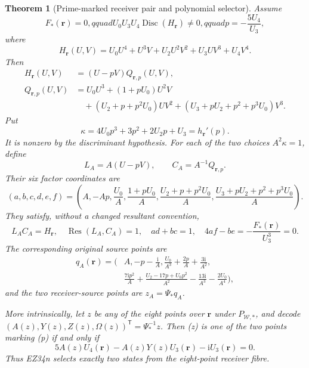 \documentclass[11pt]{article}
\newtheorem{theorem}{Theorem}[section]
\theoremstyle{definition}\newtheorem{definition}[theorem]{Definition}
\theoremstyle{remark}\newtheorem{remark}[theorem]{Remark}
\newcommand{\Disc}{\operatorname{Disc}}
\newcommand{\Res}{\operatorname{Res}}
\newcommand{\ii}{\mathrm i}
\begin{document}
\begin{theorem}[Prime-marked receiver pair and polynomial selector]
Assume
\begin{equation}
 F_*(\mathbf r)=0,qquad
 U_0U_3U_4\Disc(H_{\mathbf r})\ne0,qquad
 p=-\frac{5U_4}{U_3},                                \tag{EZ34j}
\end{equation}
where
\[
 H_{\mathbf r}(U,V)=U_0U^4+U^3V+U_2U^2V^2+U_3UV^3+U_4V^4.
\]
Then
\begin{align*}
 H_{\mathbf r}(U,V)&=(U-pV)Q_{\mathbf r,p}(U,V),\\
 Q_{\mathbf r,p}(U,V)&=U_0U^3+(1+pU_0)U^2V\\
 &\quad +(U_2+p+p^2U_0)UV^2
 +(U_3+pU_2+p^2+p^3U_0)V^3.
\end{align*}
Put
\[
 \kappa=4U_0p^3+3p^2+2U_2p+U_3=h_{\mathbf r}'(p).
\]
It is nonzero by the discriminant hypothesis.  For each of the two choices
\(A^2\kappa=1\), define
\[
 L_A=A(U-pV),\qquad C_A=A^{-1}Q_{\mathbf r,p}.
\]
Their six factor coordinates are
\begin{equation}
 (a,b,c,d,e,f)=
 \left(A,-Ap,\frac{U_0}{A},\frac{1+pU_0}{A},
 \frac{U_2+p+p^2U_0}{A},
 \frac{U_3+pU_2+p^2+p^3U_0}{A}\right).               \tag{EZ34k}
\end{equation}
They satisfy, without a changed resultant convention,
\begin{equation}
 L_AC_A=H_{\mathbf r},\quad
 \Res(L_A,C_A)=1,\quad ad+bc=1,
 \quad4af-be=-\frac{F_*(\mathbf r)}{U_3^3}=0.         \tag{EZ34l}
\end{equation}
The corresponding original source points are
\begin{align}
 q_A(\mathbf r)=\Bigg(&A,-p-\frac{\ii}{A},
 \frac{U_0}{A^3}+\frac{2p}{A}+\frac{3\ii}{A^2},\nonumber\\
 &\frac{7\ii p^2}{A}
 +\frac{U_2-17p+U_0p^2}{A^2}
 -\frac{13\ii}{A^3}-\frac{2U_0}{A^4}\Bigg),          \tag{EZ34m}
\end{align}
and the two receiver-source points are \(z_A=\Psi_*q_A\).

More intrinsically, let \(z\) be any of the eight points over \(\mathbf r\)
under \(P_{\mathcal W,*}\), and decode
\((A(z),Y(z),Z(z),\Omega(z))^{\mathsf T}=\Psi_*^{-1}z\).
Then (z) is one of the two points marking (p) if and only if
\begin{equation}
 5A(z)U_4(\mathbf r)-A(z)Y(z)U_3(\mathbf r)
                    -\ii U_3(\mathbf r)=0.            \tag{EZ34n}
\end{equation}
Thus EZ34n selects exactly two states from the eight-point receiver fibre.
\end{theorem}
\end{document}
